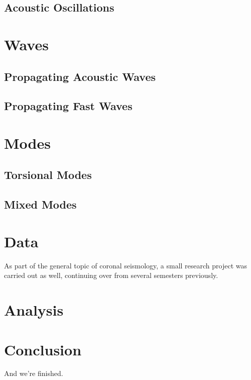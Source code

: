 \documentclass[preprint2]{aastex}
\begin{document}
\subsection{Acoustic Oscillations}
\section{Waves}
\subsection{Propagating Acoustic Waves}
\subsection{Propagating Fast Waves}
\section{Modes}
\subsection{Torsional Modes}
\subsection{Mixed Modes}

\section{Data}\label{data}
As part of the general topic of coronal seismology,
a small research project was carried out as well, continuing
over from several semesters previously.

\section{Analysis}\label{analysis}

\section{Conclusion}\label{conclusion}
And we're finished.


\end{document}
